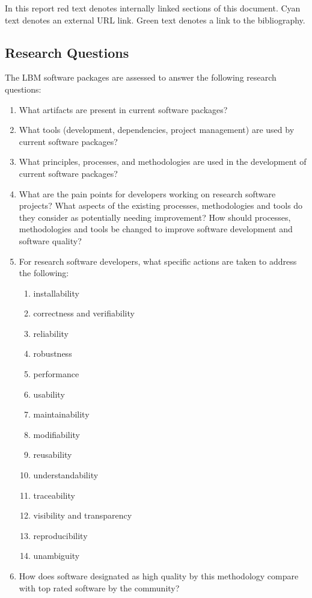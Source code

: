 \documentclass[12pt, notitlepage]{article}
\begin{document}
In this report red text denotes internally linked sections of this document. Cyan text denotes an external URL link. Green text denotes a link to the bibliography.

\subsection{Research Questions}\label{purpose}

The LBM software packages are assessed to answer the following research questions:

\begin{enumerate}
	\item What artifacts are present in current software packages? 
	\item What tools (development, dependencies, project management) are used by current software packages?
	\item What principles, processes, and methodologies are used in the development
	of current software packages?
	\item What are the pain points for developers working on research software
	projects?  What aspects of the existing processes, methodologies and tools do
	they consider as potentially needing improvement?  How should processes,
	methodologies and tools be changed to improve software development and
	software quality?
	\item For research software developers, what specific actions are taken to
	address the following:
	\begin{enumerate}
		\item installability
		\item correctness and verifiability
		\item reliability
		\item robustness
		\item performance
		\item usability
		\item maintainability
		\item modifiability
		\item reusability
		\item understandability
		\item traceability
		\item visibility and transparency
		\item reproducibility
		\item unambiguity
	\end{enumerate} 
	\item How does software designated as high quality by this methodology compare	with top rated software by the community?
\end{enumerate}
\end{document}
